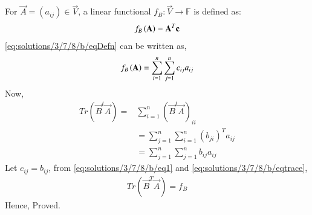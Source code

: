  For $\vec{A}=(a_{ij})\in \Vec{V}$, a linear functional $f_B:\vec{V}\longrightarrow\mathbb{F}$ is defined as:
\begin{align}
    f_B\left(\mathbf{A}\right)=\mathbf{A}^T\mathbf{c}\label{eq:solutions/3/7/8/b/eqDefn}
\end{align}
\eqref{eq:solutions/3/7/8/b/eqDefn} can be written as,
\begin{align}
    f_B\left(\mathbf{A}\right)=\sum_{i=1}^{n}\sum_{j=1}^{n}c_{ij}a_{ij}\label{eq:solutions/3/7/8/b/eq1}
\end{align}
Now,
\begin{align}
    Tr(\vec{B}^t\vec{A})=&\sum_{i=1}^{n}(\vec{B}^t\Vec{A})_{ii}\\
    &=\sum_{j=1}^{n}\sum_{i=1}^{n}(b_{ji})^Ta_{ij}\\
    &=\sum_{j=1}^{n}\sum_{j=1}^{n}b_{ij}a_{ij}\label{eq:solutions/3/7/8/b/eqtrace}
\end{align}
Let $c_{ij}=b_{ij}$, from \eqref{eq:solutions/3/7/8/b/eq1} and \eqref{eq:solutions/3/7/8/b/eqtrace},
\begin{align}
    Tr(\vec{B}^T\vec{A})=f_B
\end{align}
Hence, Proved.
